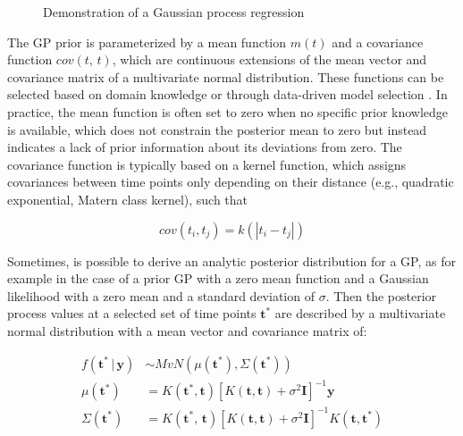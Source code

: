 \documentclass[jou, floatsintext]{apa7}
\begin{document}
\begin{figure}[!ht]
  \caption{Demonstration of a Gaussian process regression}
  \label{fig:gp_dem}
\end{figure}

The GP prior is parameterized by a mean function $m(t)$ and a covariance
function $cov(t, \, t)$, which are continuous extensions of the mean vector and
covariance matrix of a multivariate normal distribution. These functions can be
selected based on domain knowledge or through data-driven model selection
\parencite{richardson_gaussian_2017, abdessalem_automatic_2017}. In practice,
the mean function is often set to zero when no specific prior knowledge is
available, which does not constrain the posterior mean to zero but instead
indicates a lack of prior information about its deviations from zero. The
covariance function is typically based on a kernel function, which assigns
covariances between time points only depending on their distance (e.g.,
quadratic exponential, Matern class kernel), such that

\begin{equation}
  cov(t_i, t_j) = k(|t_i - t_j|)
\end{equation}

Sometimes, is possible to derive an analytic posterior distribution for a GP,
as for example in the case of a prior GP with a zero mean function and a
Gaussian likelihood with a zero mean and a standard deviation of $\sigma$. Then
the posterior process values at a selected set of time points $\textbf{t}^*$
are described by a multivariate normal distribution with a mean vector and
covariance matrix of:

\begin{equation}
  \begin{aligned}
    f(\textbf{t}^* \, | \, \textbf{y}) & \sim MvN(\mu(\textbf{t}^*),
    \Sigma(\textbf{t}^*))
    \\
    \mu(\textbf{t}^*)                  & = K(\textbf{t}^*,
    \textbf{t}){[K(\textbf{t},
            \textbf{t}) + \sigma^2
            \textbf{I}]}^{-1}\textbf{y}
    \\
    \Sigma(\textbf{t}^*)               & =K(\textbf{t}^*, \,
    \textbf{t}){[K(\textbf{t},
            \textbf{t}) + \sigma^2
            \textbf{I}]}^{-1} K(\textbf{t}, \textbf{t}^*)
  \end{aligned}
\end{equation}
\end{document}
